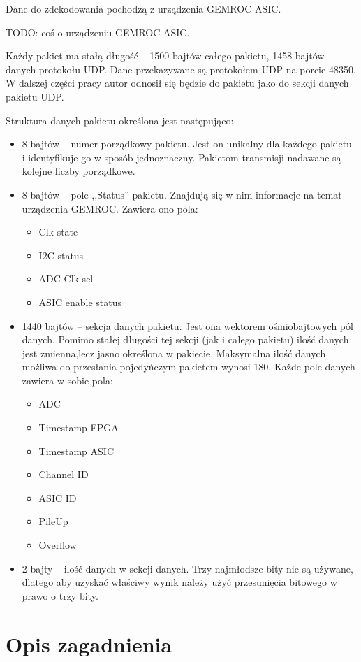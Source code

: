 \documentclass[a4paper, 12pt, twoside, openright]{article}
\begin{document}
	Dane do zdekodowania pochodzą z urządzenia GEMROC ASIC.

	TODO: coś o urządzeniu GEMROC ASIC.

	Każdy pakiet ma stałą długość -- 1500 bajtów całego pakietu, 1458 bajtów danych protokołu UDP.
	Dane przekazywane są protokołem UDP na porcie 48350.
	W dalszej części pracy autor odnosił się będzie do pakietu jako do sekcji danych pakietu UDP.

	Struktura danych pakietu określona jest następująco:
	\begin{itemize}
		\item 8 bajtów -- numer porządkowy pakietu. Jest on unikalny dla każdego pakietu i identyfikuje go w sposób jednoznaczny.
			Pakietom transmisji nadawane są kolejne liczby porządkowe.
		\item 8 bajtów -- pole ,,Status'' pakietu. Znajdują się w nim informacje na temat urządzenia GEMROC. Zawiera ono pola:
			\begin{itemize}
				\item Clk state
				\item I2C status
				\item ADC Clk sel
				\item ASIC enable status
			\end{itemize}
		\item 1440 bajtów -- sekcja danych pakietu. Jest ona wektorem ośmiobajtowych pól danych. Pomimo stałej długości tej sekcji
			(jak i całego pakietu) ilość danych jest zmienna,lecz jasno określona w pakiecie. Maksymalna ilość danych możliwa do przesłania
			pojedyńczym pakietem wynosi 180. Każde pole danych zawiera w sobie pola:
			\begin{itemize}
				\item ADC
				\item Timestamp FPGA
				\item Timestamp ASIC
				\item Channel ID
				\item ASIC ID
				\item PileUp
				\item Overflow
			\end{itemize}
		\item 2 bajty -- ilość danych w sekcji danych. Trzy najmłodsze bity nie są używane, dlatego aby uzyskać właściwy wynik
			należy użyć przesunięcia bitowego w prawo o trzy bity.
	\end{itemize}


\newpage
\section{Opis zagadnienia}
\end{document}
